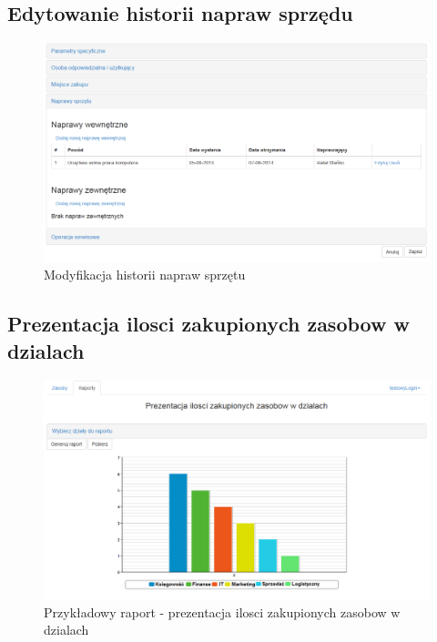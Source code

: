 \subsection{Edytowanie historii napraw sprzędu}
\begin{figure}[H]
	\centering
	\includegraphics[scale=0.4]{img/screens/naprawyWew.png}
	\caption{Modyfikacja historii napraw sprzętu}
\end{figure}

\subsection{Prezentacja ilosci zakupionych zasobow w dzialach}
\begin{figure}[H]
	\centering
	\includegraphics[scale=0.4]{img/screens/raport.png}
	\caption{Przykładowy raport - prezentacja ilosci zakupionych zasobow w dzialach}
\end{figure}
